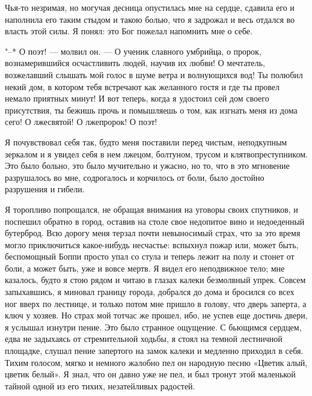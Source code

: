 Чья-то незримая, но могучая десница  опустилась мне на сердце, сдавила
его и наполнила его таким стыдом и  такою болью, что я задрожал и весь
отдался во власть этой силы. Я  понял: это Бог пожелал напомнить мне о
себе.

"--* О поэт! --- молвил он.  --- О ученик славного умбрийца, о пророк,
вознамерившийся  осчастливить людей,  научив  их  любви! О  мечтатель,
возжелавший  слышать мой  голос в  шуме  ветра и  волнующихся вод!  Ты
полюбил некий дом, в котором тебя  встречают как желанного гостя и где
ты провел  немало приятных минут! И  вот теперь, когда я  удостоил сей
дом  своего присутствия,  ты  бежишь  прочь и  помышляешь  о том,  как
изгнать меня из дома сего! О лжесвятой! О лжепророк! О поэт!

Я  почувствовал   себя  так,   будто  меня  поставили   перед  чистым,
неподкупным зеркалом и я увидел себя  в нем лжецом, болтуном, трусом и
клятвопреступником. Это было больно, это  было мучительно и ужасно, но
то, что в это мгновение разрушалось во мне, содрогалось и корчилось от
боли, было достойно разрушения и гибели.

Я  торопливо   попрощался,  не  обращая  внимания   на  уговоры  своих
спутников, и поспешил обратно в город, оставив на столе свое недопитое
вино и недоеденный бутерброд. Всю дорогу меня терзал почти невыносимый
страх,  что за  это время  могло приключиться  какое-нибудь несчастье:
вспыхнул пожар или, может быть, беспомощный Боппи просто упал со стула
и теперь  лежит на полу и  стонет от боли,  а может быть, уже  и вовсе
мертв. Я видел его неподвижное тело;  мне казалось, будто я стою рядом
и  читаю  в глазах  калеки  безмолвный  упрек. Совсем  запыхавшись,  я
миновал границу города, добрался до дома  и бросился со всех ног вверх
по лестнице, и только потом мне  пришло в голову, что дверь заперта, а
ключ  у хозяев.  Но страх  мой  тотчас же  прошел, ибо,  не успев  еще
достичь двери, я услышал изнутри  пение. Это было странное ощущение. С
бьющимся сердцем, едва  не задыхаясь от стремительной  ходьбы, я стоял
на темной лестничной площадке, слушал  пение запертого на замок калеки
и медленно приходил в себя. Тихим голосом, мягко и немного жалобно пел
он народную  песню «Цветик алый, цветик  белый». Я знал, что  он давно
уже не  пел, и был  тронут этой маленькой  тайной одной из  его тихих,
незатейливых радостей.

